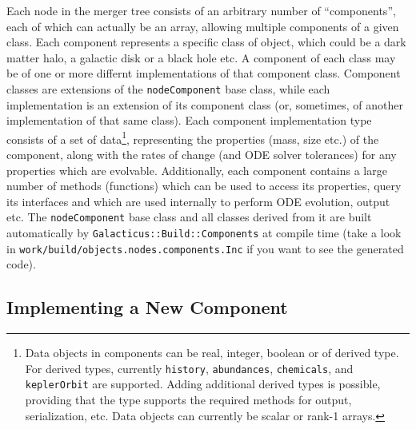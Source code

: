 Each node in the merger tree consists of an arbitrary number of ``components'', each of which can actually be an array, allowing multiple components of a given class. Each component represents a specific class of object, which could be a dark matter halo, a galactic disk or a black hole etc. A component of each class may be of one or more differnt implementations of that component class. Component classes are extensions of the {\tt nodeComponent} base class, while each implementation is an extension of its component class (or, sometimes, of another implementation of that same class). Each component implementation type consists of a set of data\footnote{Data objects in components can be real, integer, boolean or of derived type. For derived types, currently {\tt history}, {\tt abundances}, {\tt chemicals}, and {\tt keplerOrbit} are supported. Adding additional derived types is possible, providing that the type supports the required methods for output, serialization, etc. Data objects can currently be scalar or rank-1 arrays.}, representing the properties (mass, size etc.) of the component, along with the rates of change (and ODE solver tolerances) for any properties which are evolvable. Additionally, each component contains a large number of methods (functions) which can be used to access its properties, query its interfaces and which are used internally to perform ODE evolution, output etc. The {\tt nodeComponent} base class and all classes derived from it are built automatically by {\tt Galacticus::Build::Components} at compile time (take a look in {\tt work/build/objects.nodes.components.Inc} if you want to see the generated code).

\subsection{Implementing a New Component}\label{sec:ComponentImplement}

